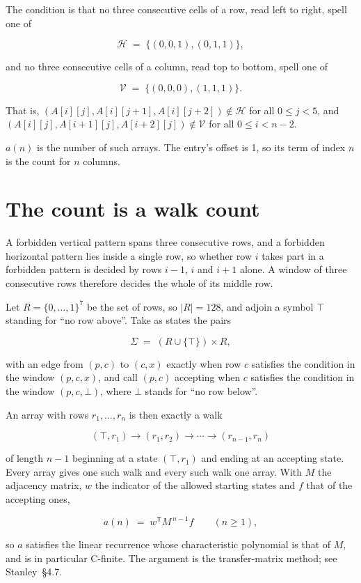 \documentclass[11pt]{article}
\theoremstyle{definition}
\begin{document}
The condition is that no three consecutive cells of a row, read left to right, spell one of

\[\mathcal{H} \;=\; \{(0,0,1), (0,1,1)\},\]

and no three consecutive cells of a column, read top to bottom, spell one of

\[\mathcal{V} \;=\; \{(0,0,0), (1,1,1)\}.\]

That is, $(A[i][j],A[i][j{+}1],A[i][j{+}2]) \notin \mathcal{H}$ for all $0 \le j < 5$, and $(A[i][j],A[i{+}1][j],A[i{+}2][j]) \notin \mathcal{V}$ for all $0 \le i < n-2$.

$a(n)$ is the number of such arrays. The entry's offset is 1, so its term of index $n$ is the count for $n$ columns.

\section{The count is a walk count}

A forbidden vertical pattern spans three consecutive rows, and a forbidden horizontal pattern lies inside a single row, so whether row $i$ takes part in a forbidden pattern is decided by rows $i-1$, $i$ and $i+1$ alone. A window of three consecutive rows therefore decides the whole of its middle row.

Let $R = \{0,\dots,1\}^{7}$ be the set of rows, so $|R| = 128$, and adjoin a symbol $\top$ standing for ``no row above''. Take as states the pairs

\[\Sigma \;=\; (R \cup \{\top\}) \times R,\]

with an edge from $(p,c)$ to $(c,x)$ exactly when row $c$ satisfies the condition in the window $(p,c,x)$, and call $(p,c)$ accepting when $c$ satisfies the condition in the window $(p,c,\bot)$, where $\bot$ stands for ``no row below''.

An array with rows $r_1,\dots,r_n$ is then exactly a walk

\[(\top,r_1) \to (r_1,r_2) \to \cdots \to (r_{n-1},r_n)\]

of length $n-1$ beginning at a state $(\top,r_1)$ and ending at an accepting state. Every array gives one such walk and every such walk one array. With $M$ the adjacency matrix, $w$ the indicator of the allowed starting states and $f$ that of the accepting ones,

\[a(n) \;=\; w^{\mathsf T} M^{\,n-1} f \qquad (n \ge 1),\]

so $a$ satisfies the linear recurrence whose characteristic polynomial is that of $M$, and is in particular C-finite. The argument is the transfer-matrix method; see Stanley~\S4.7.
\end{document}
